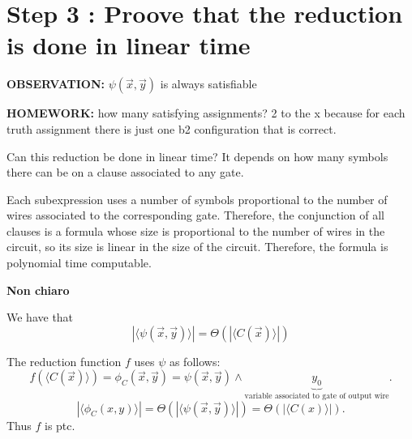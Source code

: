 \section{Step 3 : Proove that the reduction is done in linear time}
\textbf{OBSERVATION:} $\psi(\vec x,\vec y)$ is always satisfiable

\textbf{HOMEWORK:} how many satisfying assignments? 2 to the x because for each truth assignment there is just one b2 configuration that is correct.

Can this reduction be done in linear time? It depends on how many symbols there can be on a clause associated to any gate. 

Each subexpression uses a number of symbols proportional to the number of wires associated to the corresponding gate. Therefore, the conjunction of all clauses is a formula whose size is proportional to the number of wires in the circuit, so its size is linear in the size of the circuit. 
Therefore, the formula is polynomial time computable. 

\textbf{Non chiaro}

We have that
\[|\langle\psi(\vec x,\vec y)\rangle|=\Theta(|\langle C(\vec x)\rangle|)\]

The reduction function $f$ uses $\psi$ as follows:
\[
f(\langle C(\vec x)\rangle)=\phi_C(\vec x,\vec y)=\psi(\vec x,\vec y)\land\underbrace{y_0}_{\text{variable associated to gate of output wire}}.
\]
\[
|\langle\phi_C(x,y)\rangle|=\Theta(|\langle\psi(\vec x,\vec y)\rangle|)=\Theta(|\langle C(x)\rangle|).
\]
Thus $f$ is ptc.
